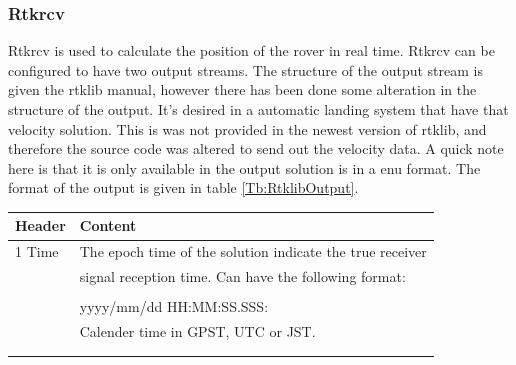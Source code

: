 \subsubsection{Rtkrcv}
Rtkrcv is used to calculate the position of the rover in real time.
Rtkrcv can be configured to have two output streams. The structure of the output stream is given the \gls{rtklib} manual\citep{Rtklib242}, however there has been done some alteration in the structure of the output. It's desired in a automatic landing system that have that velocity solution. This is was not provided in the newest version of \gls{rtklib}, and therefore the source code was altered to send out the velocity data. A quick note here is that it is only available in the output solution is in a \gls{enu} format. The format of the output is given in table \ref{Tb:RtklibOutput}.
\begin{table}[H]
\begin{center}
    \begin{tabular}{ | l | l |}
    \hline
    \textbf{Header} & \textbf{Content} \\ \hline
     1 Time & The epoch time of the solution indicate the true receiver\\& signal reception time. Can have the following format:\\&\\& yyyy/mm/dd HH:MM:SS.SSS:\\& Calender time in GPST, UTC or JST.\\&\\&
     

\end{tabular}
\end{center}
\end{table}
